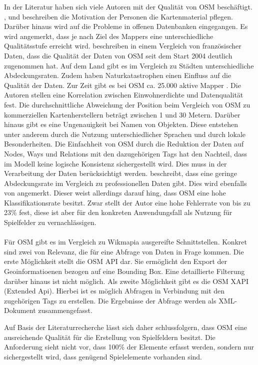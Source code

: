 In der Literatur haben sich viele Autoren mit der Qualität von OSM beschäftigt.
\textcite{Haklay.2010}, \textcite{Flanagin.2008} und \textcite{Goodchild.2007} beschreiben die Motivation der Personen die Kartenmaterial pflegen. Darüber hinaus wird auf die Probleme in offenen Datenbanken eingegangen. Es wird angemerkt, dass je nach Ziel des Mappers eine unterschiedliche Qualitätsstufe erreicht wird.
\textcite{Girres.2010} beschreiben in einem Vergleich von französischer Daten, dass die Qualität der Daten von OSM seit dem Start 2004 deutlich zugenommen hat. Auf dem Land gibt es im Vergleich zu Städten unterschiedliche Abdeckungsraten. Zudem haben Naturkatastrophen einen Einfluss auf die Qualität der Daten.\cite{Zook.2010}
Zur Zeit gibt es bei OSM ca. 25.000 aktive Mapper \cite{OSM.2013}. Die Autoren stellen eine Korrelation zwischen Einwohnerdichte und Datenqualität fest.
Die durchschnittliche Abweichung der Position beim Vergleich von OSM zu kommerziellen Kartenherstellern beträgt zwischen 1 und 30 Metern.
Darüber hinaus gibt es eine Ungenauigkeit bei Namen von Objekten. Diese entstehen unter anderem durch die Nutzung unterschiedlicher Sprachen und durch lokale Besonderheiten.
Die Einfachheit von OSM durch die Reduktion der Daten auf Nodes, Ways und Relations mit den dazugehörigen Tags hat den Nachteil, dass im Modell keine logische Konsistenz sichergestellt wird. Dies muss in der Verarbeitung der Daten berücksichtigt werden.
\textcite{Hecht.2013} beschreibt, dass eine geringe Abdeckungsrate im Vergleich zu professionellen Daten gibt. Dies wird ebenfalls von \textcite{Pfoser.2013} angemerkt. Dieser weist allerdings darauf hing, dass OSM eine hohe Klassifikationsrate besitzt. Zwar stellt der Autor eine hohe Fehlerrate von bis zu 23\% fest, diese ist aber für den konkreten Anwendungsfall als Nutzung für Spielfelder  zu vernachlässigen.
\\\\
Für OSM gibt es im Vergleich zu Wikmapia ausgereifte Schnittstellen. Konkret sind zwei von Relevanz, die für eine Abfrage von Daten in Frage kommen.
Die erste Möglichkeit stellt die OSM API dar. Sie ermöglicht den Export der Geoinformatioenen bezogen auf eine Bounding Box. Eine detaillierte Filterung darüber hinaus ist nicht möglich.
Als zweite Möglichkeit gibt es die OSM XAPI (Extended Api). Hierbei ist es möglich Abfragen in Verbindung mit den zugehörigen Tags zu erstellen.\cite{Meyer.2013} Die Ergebnisse der Abfrage werden als XML-Dokument zusammengefasst.

Auf Basis der Literaturrecherche lässt sich daher schlussfolgern, dass OSM eine ausreichende Qualität für die Erstellung von Spielfeldern besitzt. Die Anforderung sieht nicht vor, dass 100\% der Elemente erfasst werden, sondern nur sichergestellt wird, dass genügend Spielelemente vorhanden sind.



